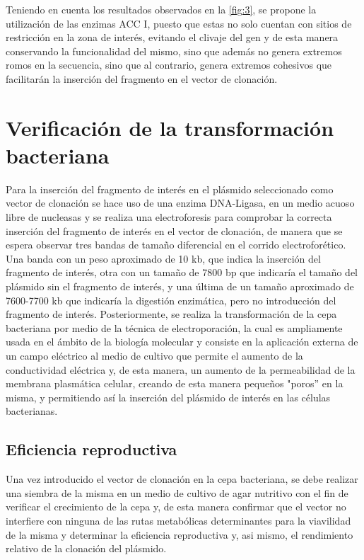 \documentclass[12pt]{article}
\begin{document}
		Teniendo en cuenta los resultados observados en la \autoref{fig:3}, se propone la utilización de las enzimas ACC I, puesto que estas no solo cuentan con sitios de restricción en la zona de interés, evitando el clivaje del gen y de esta manera conservando la funcionalidad del mismo, sino que además no genera extremos romos en la secuencia, sino que al contrario, genera extremos cohesivos que facilitarán la inserción del fragmento en el vector de clonación.
		
	\section{Verificación de la transformación bacteriana}
		Para la inserción del fragmento de interés en el pl\'asmido seleccionado como vector de clonación se hace uso de una enzima DNA-Ligasa, en un medio acuoso libre de nucleasas y se realiza una electroforesis para comprobar la correcta inserción del fragmento de interés en el vector de clonación, de manera que se espera observar tres bandas de tamaño diferencial en el corrido electroforético. Una banda con un peso aproximado de 10 kb, que indica la inserción del fragmento de interés, otra con un tamaño de 7800 bp que indicaría el tamaño del plásmido sin el fragmento de interés, y una última de un tamaño aproximado de 7600-7700 kb que indicaría la digesti\'on enzimática, pero no introducción del fragmento de interés. Posteriormente, se realiza la transformación de la cepa bacteriana por medio de la técnica de electroporación, la cual es ampliamente usada en el ámbito de la biología molecular y consiste en la aplicación externa de un campo eléctrico al medio de cultivo que permite el aumento de la conductividad eléctrica y, de esta manera, un aumento de la permeabilidad de la membrana plasmática celular, creando de esta manera pequeños "poros'' en la misma, y permitiendo así la inserción del plásmido de interés en las células bacterianas.
		\subsection{Eficiencia reproductiva}
		Una vez introducido el vector de clonación en la cepa bacteriana, se debe realizar una siembra de la misma en un medio de cultivo de agar nutritivo con el fin de verificar el crecimiento de la cepa y, de esta manera confirmar que el vector no interfiere con ninguna de las rutas metabólicas determinantes para la viavilidad de la misma y determinar la eficiencia reproductiva y, asi mismo, el rendimiento relativo de la clonación del plásmido.
		
\end{document}
